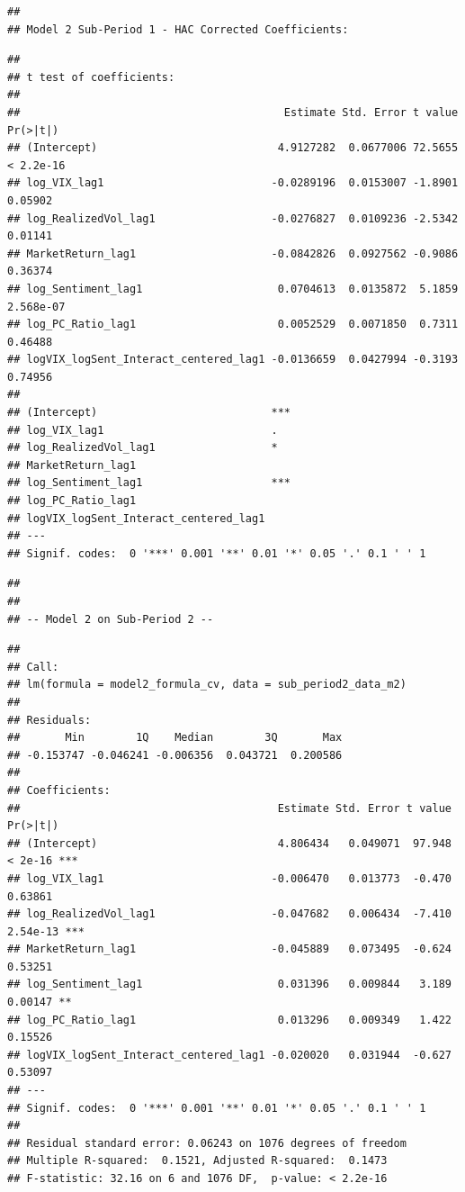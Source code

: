 \documentclass[
]{article}
\begin{document}
\begin{verbatim}
## 
## Model 2 Sub-Period 1 - HAC Corrected Coefficients:
\end{verbatim}

\begin{verbatim}
## 
## t test of coefficients:
## 
##                                         Estimate Std. Error t value  Pr(>|t|)
## (Intercept)                            4.9127282  0.0677006 72.5655 < 2.2e-16
## log_VIX_lag1                          -0.0289196  0.0153007 -1.8901   0.05902
## log_RealizedVol_lag1                  -0.0276827  0.0109236 -2.5342   0.01141
## MarketReturn_lag1                     -0.0842826  0.0927562 -0.9086   0.36374
## log_Sentiment_lag1                     0.0704613  0.0135872  5.1859 2.568e-07
## log_PC_Ratio_lag1                      0.0052529  0.0071850  0.7311   0.46488
## logVIX_logSent_Interact_centered_lag1 -0.0136659  0.0427994 -0.3193   0.74956
##                                          
## (Intercept)                           ***
## log_VIX_lag1                          .  
## log_RealizedVol_lag1                  *  
## MarketReturn_lag1                        
## log_Sentiment_lag1                    ***
## log_PC_Ratio_lag1                        
## logVIX_logSent_Interact_centered_lag1    
## ---
## Signif. codes:  0 '***' 0.001 '**' 0.01 '*' 0.05 '.' 0.1 ' ' 1
\end{verbatim}

\begin{verbatim}
## 
## 
## -- Model 2 on Sub-Period 2 --
\end{verbatim}

\begin{verbatim}
## 
## Call:
## lm(formula = model2_formula_cv, data = sub_period2_data_m2)
## 
## Residuals:
##       Min        1Q    Median        3Q       Max 
## -0.153747 -0.046241 -0.006356  0.043721  0.200586 
## 
## Coefficients:
##                                        Estimate Std. Error t value Pr(>|t|)    
## (Intercept)                            4.806434   0.049071  97.948  < 2e-16 ***
## log_VIX_lag1                          -0.006470   0.013773  -0.470  0.63861    
## log_RealizedVol_lag1                  -0.047682   0.006434  -7.410 2.54e-13 ***
## MarketReturn_lag1                     -0.045889   0.073495  -0.624  0.53251    
## log_Sentiment_lag1                     0.031396   0.009844   3.189  0.00147 ** 
## log_PC_Ratio_lag1                      0.013296   0.009349   1.422  0.15526    
## logVIX_logSent_Interact_centered_lag1 -0.020020   0.031944  -0.627  0.53097    
## ---
## Signif. codes:  0 '***' 0.001 '**' 0.01 '*' 0.05 '.' 0.1 ' ' 1
## 
## Residual standard error: 0.06243 on 1076 degrees of freedom
## Multiple R-squared:  0.1521, Adjusted R-squared:  0.1473 
## F-statistic: 32.16 on 6 and 1076 DF,  p-value: < 2.2e-16
\end{verbatim}
\end{document}
